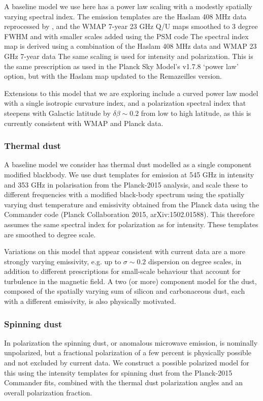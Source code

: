 A baseline model we use here has a power law scaling with a modestly spatially varying spectral index.  The emission templates are the Haslam 408 MHz data reprocessed by \cite{remazeilles/etal:2015}, 
and the WMAP 7-year 23 GHz Q/U maps \cite{jarosik/etal:2011}
smoothed to 3 degree FWHM and with smaller scales added using the PSM code \cite{delabrouille/etal:2013}
The spectral index map is derived using a combination of the Haslam 
408 MHz data and WMAP 23 GHz 7-year data \cite{miville-Deschenes/etal:2008}
The same scaling is used for intensity and polarization.  This is the same prescription as used in the Planck Sky Model's v1.7.8 `power law' option, but with the Haslam map updated to the Remazeilles version. 

Extensions to this model that we are exploring include a curved power 
law model with a single isotropic curvature index, and a polarization spectral index that steepens with Galactic latitude by $\delta \beta \sim 0.2$ from low to high latitude, as this is currently consistent with WMAP and Planck data. 

\subsubsection{Thermal dust}
A baseline model we consider has thermal dust modelled as a single component modified  blackbody. We use dust templates for emission at 545 GHz in intensity and 
 353 GHz in polarisation from the Planck-2015 analysis, and scale these to different  frequencies with a modified black-body spectrum using the spatially varying dust temperature and emissivity obtained from the Planck data using the Commander code (Planck Collaboration  2015, arXiv:1502.01588). This therefore assumes the same spectral index for  polarization as for intensity.  These templates are smoothed to degree scale.

Variations on this model that appear consistent with current data are a more strongly varying emissivity, e.g. up to $\sigma \sim 0.2$ dispersion on degree scales,  in addition to different prescriptions for small-scale behaviour that account for turbulence in the magnetic field. A two (or more) component model for the dust, composed of the spatially varying sum of silicon and carbonaceous dust, each with a different emissivity, is also physically motivated.

\subsubsection{Spinning dust}
In polarization the spinning dust, or anomalous microwave emission, is nominally unpolarized, but a fractional polarization of a few percent is physically possible and not excluded by current data. We construct a possible polarized model for this using the intensity templates for spinning dust from the Planck-2015 Commander fits, combined with the thermal dust polarization angles and an overall polarization fraction.

